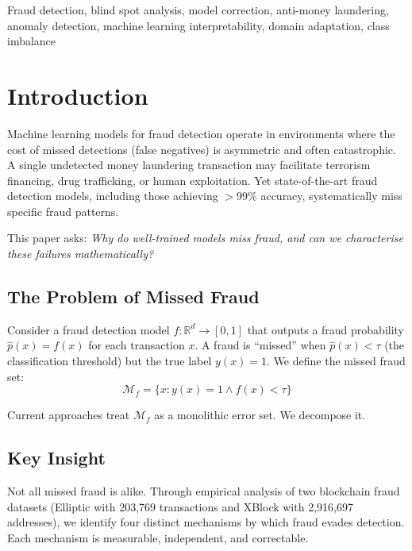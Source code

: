 \documentclass[journal]{IEEEtran}
\newcommand{\R}{\mathbb{R}}
\begin{document}
\begin{IEEEkeywords}
Fraud detection, blind spot analysis, model correction, anti-money laundering, anomaly detection, machine learning interpretability, domain adaptation, class imbalance
\end{IEEEkeywords}

\section{Introduction}
\label{sec:introduction}

Machine learning models for fraud detection operate in environments where the cost of missed detections (false negatives) is asymmetric and often catastrophic. A single undetected money laundering transaction may facilitate terrorism financing, drug trafficking, or human exploitation. Yet state-of-the-art fraud detection models, including those achieving $>$99\% accuracy, systematically miss specific fraud patterns.

This paper asks: \textit{Why do well-trained models miss fraud, and can we characterise these failures mathematically?}

\subsection{The Problem of Missed Fraud}
\label{ssec:missed_fraud}

Consider a fraud detection model $f: \R^d \to [0,1]$ that outputs a fraud probability $\hat{p}(x) = f(x)$ for each transaction $x$. A fraud is ``missed'' when $\hat{p}(x) < \tau$ (the classification threshold) but the true label $y(x) = 1$. We define the missed fraud set:
\begin{equation}
  \mathcal{M}_f = \{x : y(x) = 1 \wedge f(x) < \tau\}
  \label{eq:missed_set}
\end{equation}

Current approaches treat $\mathcal{M}_f$ as a monolithic error set. We decompose it.

\subsection{Key Insight}
\label{ssec:key_insight}

Not all missed fraud is alike. Through empirical analysis of two blockchain fraud datasets (Elliptic with 203{,}769 transactions and XBlock with 2{,}916{,}697 addresses), we identify four distinct mechanisms by which fraud evades detection. Each mechanism is measurable, independent, and correctable.
\end{document}
